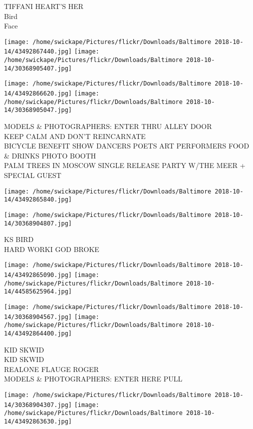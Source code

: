 \documentclass[10pt,letterpaper]{article}
\begin{document}
TIFFANI HEART'S HER\\
Bird\\
Face
\pagebreak

\texttt{[image: /home/swickape/Pictures/flickr/Downloads/Baltimore 2018-10-14/43492867440.jpg]}
\texttt{[image: /home/swickape/Pictures/flickr/Downloads/Baltimore 2018-10-14/30368905407.jpg]}

\texttt{[image: /home/swickape/Pictures/flickr/Downloads/Baltimore 2018-10-14/43492866620.jpg]}
\texttt{[image: /home/swickape/Pictures/flickr/Downloads/Baltimore 2018-10-14/30368905047.jpg]}

MODELS \& PHOTOGRAPHERS: ENTER THRU ALLEY DOOR\\
KEEP CALM AND DON'T REINCARNATE\\
BICYCLE BENEFIT SHOW DANCERS POETS ART PERFORMERS FOOD \& DRINKS PHOTO BOOTH\\
PALM TREES IN MOSCOW SINGLE RELEASE PARTY W/THE MEER + SPECIAL GUEST
\pagebreak

\texttt{[image: /home/swickape/Pictures/flickr/Downloads/Baltimore 2018-10-14/43492865840.jpg]}

\vspace{0.25in}
\texttt{[image: /home/swickape/Pictures/flickr/Downloads/Baltimore 2018-10-14/30368904807.jpg]}

KS BIRD\\
HARD WORKI GOD BROKE
\pagebreak

\texttt{[image: /home/swickape/Pictures/flickr/Downloads/Baltimore 2018-10-14/43492865090.jpg]}
\texttt{[image: /home/swickape/Pictures/flickr/Downloads/Baltimore 2018-10-14/44585625964.jpg]}

\texttt{[image: /home/swickape/Pictures/flickr/Downloads/Baltimore 2018-10-14/30368904567.jpg]}
\texttt{[image: /home/swickape/Pictures/flickr/Downloads/Baltimore 2018-10-14/43492864400.jpg]}

KID SKWID\\
KID SKWID\\
REALONE FLAUGE ROGER\\
MODELS \& PHOTOGRAPHERS: ENTER HERE PULL
\pagebreak

\texttt{[image: /home/swickape/Pictures/flickr/Downloads/Baltimore 2018-10-14/30368904307.jpg]}
\texttt{[image: /home/swickape/Pictures/flickr/Downloads/Baltimore 2018-10-14/43492863630.jpg]}
\end{document}

